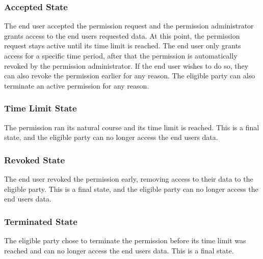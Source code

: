\subsubsection{Accepted State}
The end user accepted the permission request and the permission administrator grants access to the end users requested data.
At this point, the permission request stays active until its time limit is reached.
The end user only grants access for a specific time period, after that the permission is automatically revoked by the permission administrator.
If the end user wishes to do so, they can also revoke the permission earlier for any reason.
The eligible party can also terminate an active permission for any reason.

\subsubsection{Time Limit State}
The permission ran its natural course and its time limit is reached.
This is a final state, and the eligible party can no longer access the end users data.

\subsubsection{Revoked State}
The end user revoked the permission early, removing access to their data to the eligible party.
This is a final state, and the eligible party can no longer access the end users data.

\subsubsection{Terminated State}
The eligible party chose to terminate the permission before its time limit was reached and can no longer access the end users data.
This is a final state.